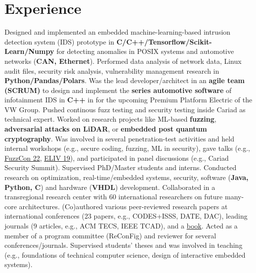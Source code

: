 \documentclass[11pt,a4paper, sans, colorlinks, linkcolor=true]{moderncv}
\begin{document}
\section{Experience}
 {Designed and implemented an embedded machine-learning-based intrusion detection system (IDS) prototype in \textbf{C/C++/Tensorflow/Scikit-Learn/Numpy} for detecting anomalies in POSIX systems and automotive networks (\textbf{CAN, Ethernet}). 
Performed data analysis of network data, Linux audit files, security risk analysis, vulnerability management research in \textbf{Python/Pandas/Polars}. 
Was the lead developer/architect in an \textbf{agile team (SCRUM)} to design and implement the \textbf{series automotive software} of infotainment IDS in \textbf{C++} in  for the upcoming Premium Platform Electric of the VW Group.
Pushed continous fuzz testing and security testing inside Cariad as technical expert.
Worked on research projects like ML-based \textbf{fuzzing}, \textbf{adversarial attacks on LiDAR}, or \textbf{embedded post quantum cryptography}. 
Was involved in several penetration-test activities and held internal workshops (e.g., secure coding, fuzzing, ML in security), gave talks (e.g., {\href{https://weichslgartner.github.io/andreas_weichslgartner_fuzzcon.pdf}{FuzzCon 22}}, {\href{https://weichslgartner.github.io/IDS-Audi.pdf}{ELIV 19}}), and participated in panel discussions (e.g., Cariad Security Summit). Supervised PhD/Master students and interns.  }
 {Conducted research on optimization, real-time/embedded systems, security, software (\textbf{Java, Python, C}) and hardware (\textbf{VHDL}) development. Collaborated in a transregional research center with 60 international researchers on future many-core architectures. (Co)authored various peer-reviewed research papers at international conferences (23 papers, e.g., CODES+ISSS, DATE, DAC), leading journals (9 articles, e.g., ACM TECS, IEEE TCAD), and a \href{https://link.springer.com/book/10.1007/978-981-10-7356-4}{book}. Acted as a member of a program committee (ReConFig) and reviewer for several conferences/journals. 
	Supervised students' theses and was involved in teaching (e.g., foundations of technical computer science, design of interactive embedded systems).} %
\vspace{-0,4cm}
\end{document}
